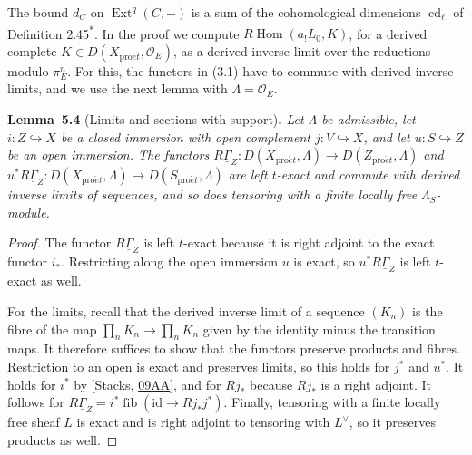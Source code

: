 \documentclass[11pt]{article}
\newenvironment{bpstatement}[2]{\par\addvspace{0.6\baselineskip}\noindent\textbf{#1}#2\textbf{.}\enspace\ignorespaces}
  {\par\addvspace{0.4\baselineskip}}
\newenvironment{bpstatementit}[2]{\begin{bpstatement}{#1}{#2}\itshape\ignorespaces}{\end{bpstatement}}
\newcommand{\bpout}[1]{#1\textsuperscript{\hyperlink{bp-outside}{\ensuremath{\ast}}}}
\providecommand{\Ext}{}\renewcommand{\Ext}{\operatorname{Ext}}
\providecommand{\fib}{}\renewcommand{\fib}{\operatorname{fib}}
\begin{document}
The bound \(d_C\) on \(\Ext^q(C,-)\) is a sum of the cohomological dimensions \(\operatorname{cd}_\ell\) of Definition \bpout{2.45}. In the proof we compute \(R\!\operatorname{Hom}(a_!L_0,K)\), for a derived complete \(K\in D(X_{\mathrm{pro}\acute{e}t},\mathcal O_E)\), as a derived inverse limit over the reductions modulo \(\pi_E^n\). For this, the functors in (3.1) have to commute with derived inverse limits, and we use the next lemma with \(\Lambda=\mathcal O_E\).

\label{bp15}%
\begin{bpstatementit}{Lemma~5.4}{ (Limits and sections with support)}
Let \(\Lambda\) be admissible, let \(i:Z\hookrightarrow X\) be a closed immersion with open complement \(j:V\hookrightarrow X\), and let \(u:S\hookrightarrow Z\) be an open immersion. The functors \(R\underline\Gamma_Z:D(X_{\mathrm{pro}\acute{e}t},\Lambda)\to D(Z_{\mathrm{pro}\acute{e}t},\Lambda)\) and \(u^*R\underline\Gamma_Z:D(X_{\mathrm{pro}\acute{e}t},\Lambda)\to D(S_{\mathrm{pro}\acute{e}t},\Lambda)\) are left \(t\)-exact and commute with derived inverse limits of sequences, and so does tensoring with a finite locally free \(\Lambda_S\)-module.
\end{bpstatementit}

\begin{proof}[{Proof}]\label{bp16}%
The functor \(R\underline\Gamma_Z\) is left \(t\)-exact because it is right adjoint to the exact functor \(i_*\). Restricting along the open immersion \(u\) is exact, so \(u^*R\underline\Gamma_Z\) is left \(t\)-exact as well.

For the limits, recall that the derived inverse limit of a sequence \((K_n)\) is the fibre of the map \(\prod_nK_n\to\prod_nK_n\) given by the identity minus the transition maps. It therefore suffices to show that the functors preserve products and fibres. Restriction to an open is exact and preserves limits, so this holds for \(j^*\) and \(u^*\). It holds for \(i^*\) by [Stacks, \href{https://stacks.math.columbia.edu/tag/09AA}{09AA}], and for \(Rj_*\) because \(Rj_*\) is a right adjoint. It follows for \(R\underline\Gamma_Z=i^*\fib(\mathrm{id}\to Rj_*j^*)\). Finally, tensoring with a finite locally free sheaf \(L\) is exact and is right adjoint to tensoring with \(L^\vee\), so it preserves products as well.
\end{proof}
\end{document}
